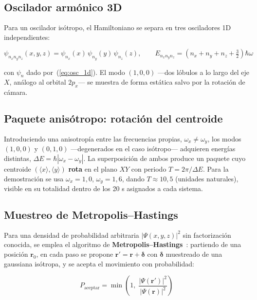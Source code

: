 \documentclass[12pt, a4paper]{article}
\begin{document}
\subsection{Oscilador armónico 3D}

Para un oscilador isótropo, el Hamiltoniano se separa en tres
osciladores 1D independientes:

\begin{equation}
  \psi_{n_x n_y n_z}(x,y,z) = \psi_{n_x}(x)\,\psi_{n_y}(y)\,\psi_{n_z}(z),
  \qquad
  E_{n_x n_y n_z} = \left(n_x+n_y+n_z+\tfrac32\right)\hbar\omega
  \label{eq:osc_3d}
\end{equation}

con $\psi_n$ dado por~(\ref{eq:osc_1d}). El modo $(1,0,0)$ —dos
lóbulos a lo largo del eje $X$, análogo al orbital $2p_x$— se muestra
de forma estática salvo por la rotación de cámara.

\subsection{Paquete anisótropo: rotación del centroide}

Introduciendo una anisotropía entre las frecuencias propias,
$\omega_x \neq \omega_y$, los modos $(1,0,0)$ y $(0,1,0)$ —degenerados
en el caso isótropo— adquieren energías distintas,
$\Delta E = \hbar|\omega_x-\omega_y|$. La superposición de ambos
produce un paquete cuyo centroide $(\langle x\rangle,\langle y\rangle)$
\textbf{rota} en el plano $XY$ con periodo $T=2\pi/\Delta E$. Para la
demostración se usa $\omega_x=1{,}0$, $\omega_y=1{,}6$, dando
$T\approx 10{,}5$ (unidades naturales), visible en su totalidad dentro
de los 20 s asignados a cada sistema.

\subsection{Muestreo de Metropolis--Hastings}

Para una densidad de probabilidad arbitraria $|\Psi(x,y,z)|^2$ sin
factorización conocida, se emplea el algoritmo de
\textbf{Metropolis--Hastings}~\cite{griffiths2018}: partiendo de una
posición $\mathbf r_0$, en cada paso se propone
$\mathbf r' = \mathbf r + \boldsymbol\delta$ con $\boldsymbol\delta$
muestreado de una gaussiana isótropa, y se acepta el movimiento con
probabilidad:

\begin{equation}
  P_{\text{aceptar}} = \min\!\left(1,\; \frac{|\Psi(\mathbf r')|^2}{|\Psi(\mathbf r)|^2}\right)
  \label{eq:metropolis}
\end{equation}
\end{document}

